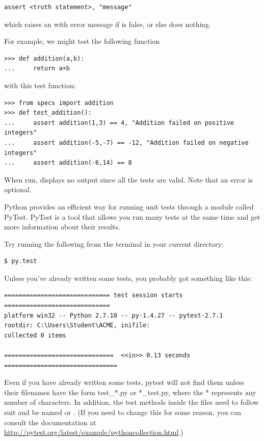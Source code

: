 \begin{lstlisting}
assert <truth statement>, "message"
\end{lstlisting}

which raises an  with error message  if  is false, or else does nothing.

For example, we might test the following function

\begin{lstlisting}
>>> def addition(a,b):
...     return a+b
\end{lstlisting}

with this test function:

\begin{lstlisting}
>>> from specs import addition
>>> def test_addition():
...     assert addition(1,3) == 4, "Addition failed on positive integers"
...     assert addition(-5,-7) == -12, "Addition failed on negative integers"
...     assert addition(-6,14) == 8
\end{lstlisting}

When run,  displays no output since all the tests are valid. Note that an error is optional.

Python provides an efficient way for running unit tests through a module called PyTest. PyTest is a tool that allows you run many tests at the same time and get more information about their results.

Try running the following from the terminal in your current directory:

\begin{lstlisting}
$ py.test
\end{lstlisting}

Unless you've already written some tests, you probably got something like this:

\begin{lstlisting}
============================= test session starts =============================
platform win32 -- Python 2.7.10 -- py-1.4.27 -- pytest-2.7.1
rootdir: C:\Users\Student\ACME, inifile:
collected 0 items

==============================  <<in>> 0.13 seconds ===============================
\end{lstlisting}

Even if you have already written some tests, pytest will not find them unless their filenames have the form test\_*.py or *\_test.py, where the * represents any number of characters.
In addition, the test methods inside the files need to follow suit and be named  or .
(If you need to change this for some reason, you can consult the documentation at \url{http://pytest.org/latest/example/pythoncollection.html}.)

